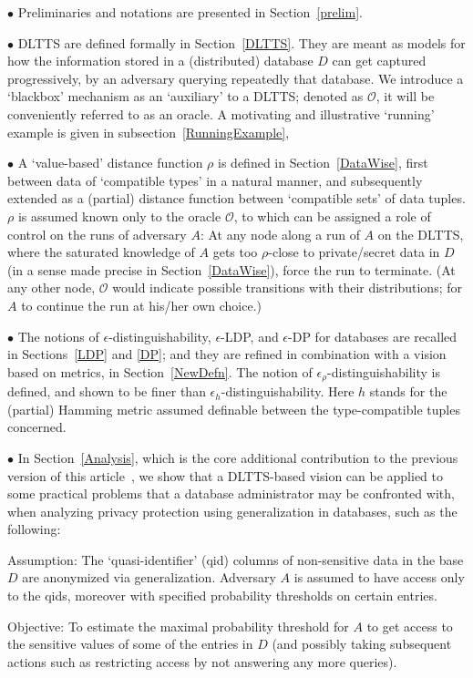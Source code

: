\documentclass[pdflatex]{article}
\def \o {{\mathcal{O}}}
\def \lft {\noindent}
\begin{document}
   \vspace*{1mm}
    {%
     
   $\bullet$ Preliminaries and notations are presented  in Section~\ref{prelim}. 

  $\bullet$ DLTTS are defined formally in Section~\ref{DLTTS}. They are meant as 
  models for how the information stored in a (distributed) database $D$ can get captured
  progressively, by an adversary querying repeatedly  that database.
  We introduce a `blackbox'  mechanism as an `auxiliary' to a DLTTS; denoted as $\o$,
  it will  be conveniently  referred to  as an  oracle. A motivating and  illustrative `running'
  example is given in subsection~\ref{RunningExample}, 

  $\bullet$ A `value-based' distance function $\rho$ is defined in   Section~\ref{DataWise}, 
  first between data of `compatible types' in a natural manner, and subsequently extended
  as a (partial) distance function between `compatible sets' of data tuples.   $\rho$ is
  assumed known only to the oracle $\o$, to which can be assigned a role of  control  on
  the runs of adversary $A$:  At any node along a run of $A$ on the DLTTS, where the 
  saturated knowledge of $A$ gets too $\rho$-close to private/secret  data in $D$ (in
  a sense made  precise in Section~\ref{DataWise}),   force  the run to terminate.
  (At any other node, $\o$ would indicate possible transitions with their  distributions;
  for $A$ to continue the run at his/her own choice.) 
  
    
  $\bullet$ The notions of $\epsilon$-distinguishability,  $\epsilon$-LDP,  and 
  $\epsilon$-DP for databases are recalled in Sections~\ref{LDP} and \ref{DP};   and they
  are refined in combination with a vision  based on metrics,  in Section~\ref{NewDefn}.
  The notion of $\epsilon_{\rho}$-distin\-guishability is defined, and shown  to be
  finer  than  $\epsilon_h$-dis\-tinguishability.  Here $h$ stands for the (partial) Hamming
  metric assumed definable  between the type-compatible tuples concerned. 
  

  $\bullet$  In Section~\ref{Analysis}, which is the core additional contribution to the
  previous version of this article~\cite{siva-etal-2022}, we show that a DLTTS-based
  vision can be   applied  to some practical problems {that a database administrator
  may be confronted with, when analyzing privacy protection using generalization
  in databases},  such as the following:
  
  Assumption: The  `quasi-identifier'  (qid) columns of non-sensitive data in the base
  $D$ are   anonymized via generalization. Adversary $A$ is assumed to have access
  only to the qids,  moreover with specified probability thresholds  on  certain entries.
  \par\indent
  Objective: To estimate the maximal probability threshold for $A$ to get
  access to the sensitive values of some of the entries in $D$ (and possibly taking
  subsequent actions such as restricting access by not answering any more queries). 

}
\end{document}
